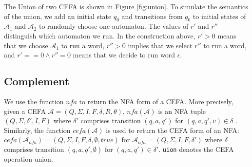 \documentclass[sigconf]{acmart}
\newcommand*{\aut}{\mathcal{A}}
\begin{document}
The Union of two CEFA is shown in Figure \ref{fig:union}. To simulate the semantics of the union, we add an initial state $q_0$ and transitions from $q_0$ to initial states of $\aut_1$ and $\aut_2$ to randomly choose one automaton. The values of $r'$ and $r''$ distinguish which automaton we run. In the construction above, $r'>0$ means that we choose $\aut_1$ to run a word, $r''>0$ implies that we select $r''$ to run a word, and $r'==0\wedge r''=0$ means that we decide to run word $\epsilon$.

\subsection{Complement}\label{subsec:comp}
We use the function $nfa$ to return the NFA form of a CEFA. More precisely, given a CEFA $\aut = (Q, \Sigma, I, F, \delta, R, \theta)$, $nfa(\aut)$ is an NFA tuple $(Q, \Sigma, \delta', I, F)$  where $\delta'$ comprises transition $(q, a, q')$ for $(q, a, q', \bar{v})\in \delta$ . Similarly, the function $cefa(\aut)$ is used to return the CEFA form of an NFA: $cefa(\aut_{nfa}) = (Q, \Sigma, I, F, \delta, \emptyset, true)$ for $\aut_{nfa} = (Q, \Sigma, I, F, \delta')$ where $\delta$ comprises transition $(q, a, q', \emptyset)$ for $(q, a, q')\in \delta'$. \verb|uion| denotes the CEFA operation union.
\end{document}
